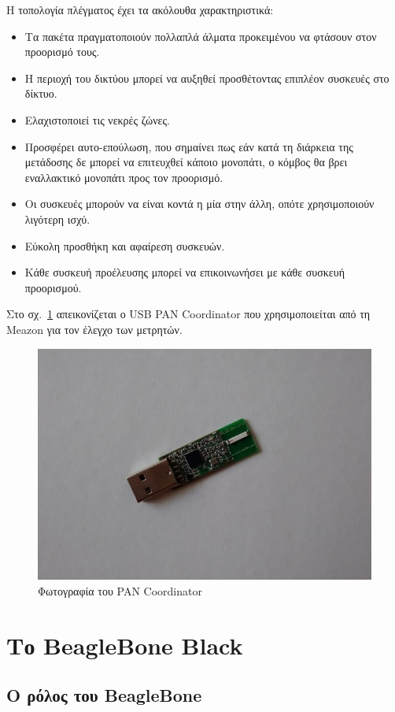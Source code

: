 \documentclass[12pt, a4paper, oneside]{report}
\begin{document}
Η τοπολογία πλέγματος έχει τα ακόλουθα χαρακτηριστικά:
\begin{itemize}
\item Τα πακέτα πραγματοποιούν πολλαπλά άλματα προκειμένου να φτάσουν στον προορισμό τους.
\item Η περιοχή του δικτύου μπορεί να αυξηθεί προσθέτοντας επιπλέον συσκευές στο δίκτυο.
\item Ελαχιστοποιεί τις νεκρές ζώνες.
\item Προσφέρει αυτο-επούλωση, που σημαίνει πως εάν κατά τη διάρκεια της μετάδοσης δε μπορεί να επιτευχθεί κάποιο μονοπάτι, ο κόμβος θα βρει εναλλακτικό μονοπάτι προς τον προορισμό.
\item Οι συσκευές μπορούν να είναι κοντά η μία στην άλλη, οπότε χρησιμοποιούν λιγότερη ισχύ.
\item Εύκολη προσθήκη και αφαίρεση συσκευών.
\item Κάθε συσκευή προέλευσης μπορεί να επικοινωνήσει με κάθε συσκευή
προορισμού.
\end{itemize}

Στο σχ.~\ref{eik17} απεικονίζεται ο USB PAN Coordinator που χρησιμοποιείται από τη Meazon για τον έλεγχο των μετρητών.
\begin{figure}[!hb]
\centering
\includegraphics[scale=0.5]{eikona_17}
\caption{Φωτογραφία του PAN Coordinator}\label{eik17}
\end{figure}

\chapter{Το BeagleBone Black}

\section{Ο ρόλος του BeagleBone}
\end{document}
